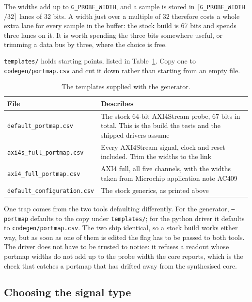 \documentclass[../manual.tex]{subfiles}
\begin{document}
The widths add up to \texttt{G\_PROBE\_WIDTH}, and a sample is stored in $\lceil$\texttt{G\_PROBE\_WIDTH}$/32\rceil$ lanes of 32 bits. A width just over a multiple of 32 therefore costs a whole extra lane for every sample in the buffer: the stock build is 67 bits and spends three lanes on it. It is worth spending the three bits somewhere useful, or trimming a data bus by three, where the choice is free.

\texttt{templates/} holds starting points, listed in Table~\ref{tab:codegen_templates}. Copy one to \texttt{codegen/portmap.csv} and cut it down rather than starting from an empty file.

\begin{table}[H]
    \centering
    \begin{tabularx}{\textwidth}{|l|X|}
        \hline
        \rowcolor{gray!40} \textbf{File} & \textbf{Describes} \\
        \hline
        \texttt{default\_portmap.csv} & The stock 64-bit AXI4Stream probe, 67 bits in total. This is the build the tests and the shipped drivers assume \\
        \hline
        \texttt{axi4s\_full\_portmap.csv} & Every AXI4Stream signal, clock and reset included. Trim the widths to the link \\
        \hline
        \texttt{axi4\_full\_portmap.csv} & AXI4 full, all five channels, with the widths taken from Microchip application note AC409 \\
        \hline
        \texttt{default\_configuration.csv} & The stock generics, as printed above \\
        \hline
    \end{tabularx}
    \caption{The templates supplied with the generator.}
    \label{tab:codegen_templates}
\end{table}

One trap comes from the two tools defaulting differently. For the generator, \texttt{--portmap} defaults to the copy under \texttt{templates/}; for the python driver it defaults to \texttt{codegen/portmap.csv}. The two ship identical, so a stock build works either way, but as soon as one of them is edited the flag has to be passed to both tools. The driver does not have to be trusted to notice: it refuses a readout whose portmap widths do not add up to the probe width the core reports, which is the check that catches a portmap that has drifted away from the synthesised core.

\subsection{Choosing the signal type}
\label{sec:codegen_types}
\end{document}
